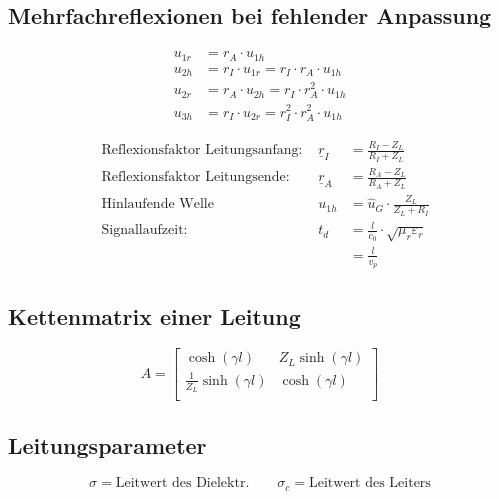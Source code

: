 \subsection{Mehrfachreflexionen bei fehlender Anpassung}

\begin{align*}
    u_{1r} & = r_A\cdot u_{1h}                                \\
    u_{2h} & = r_I\cdot u_{1r} = r_I\cdot r_A\cdot u_{1h}     \\
    u_{2r} & = r_A\cdot u_{2h} = r_I\cdot r_A^2\cdot u_{1h}   \\
    u_{3h} & = r_I\cdot u_{2r} = r_I^2\cdot r_A^2\cdot u_{1h}
\end{align*}

\begin{align*}
     & \text{Reflexionsfaktor Leitungsanfang: } & \underline{r}_I & = \frac{R_I - Z_L}{R_I + Z_L}                 \\
     & \text{Reflexionsfaktor Leitungsende: }   & \underline{r}_A & = \frac{R_A - Z_L}{R_A + Z_L}                 \\
     & \text{Hinlaufende Welle}                 & u_{1h}          & = \hat{u}_G \cdot\frac{Z_L}{Z_L+R_I}          \\
     & \text{Signallaufzeit: }                  & t_d             & = \frac{l}{c_0}\cdot\sqrt{\mu_r\varepsilon_r} \\
     &                                          &                 & = \frac{l}{v_p}
\end{align*}
\subsection{Kettenmatrix einer Leitung}
\[
    A =
    \left[ {\begin{array}{cc}
                    \cosh(\gamma l)               & Z_L \sinh(\gamma l) \\
                    \frac{1}{Z_L} \sinh(\gamma l) & \cosh(\gamma l)     \\
                \end{array} } \right]
\]
\subsection{Leitungsparameter}

{\small\[
	\sigma = \text{Leitwert des Dielektr.} \qquad \sigma_c = \text{Leitwert des Leiters}
	\]}

